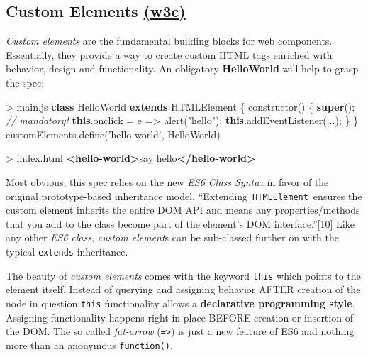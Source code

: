 \documentclass[]{assets/latex/ieee}
\newenvironment{Shaded}{}{}
\newcommand{\KeywordTok}[1]{\textcolor[rgb]{0.00,0.44,0.13}{\textbf{{#1}}}}
\newcommand{\StringTok}[1]{\textcolor[rgb]{0.25,0.44,0.63}{{#1}}}
\newcommand{\CommentTok}[1]{\textcolor[rgb]{0.38,0.63,0.69}{\textit{{#1}}}}
\newcommand{\VariableTok}[1]{\textcolor[rgb]{0.10,0.09,0.49}{{#1}}}
\newcommand{\OperatorTok}[1]{\textcolor[rgb]{0.40,0.40,0.40}{{#1}}}
\newcommand{\AttributeTok}[1]{\textcolor[rgb]{0.49,0.56,0.16}{{#1}}}
\newcommand{\NormalTok}[1]{{#1}}
\begin{document}
\subsection{\texorpdfstring{Custom Elements
\href{http://w3c.github.io/webcomponents/spec/custom/}{(w3c)}}{Custom Elements (w3c)}}\label{custom-elements-w3c}

\emph{Custom elements} are the fundamental building blocks for web
components. Essentially, they provide a way to create custom HTML tags
enriched with behavior, design and functionality. An obligatory
\textbf{HelloWorld} will help to grasp the spec:

\begin{Shaded}
\begin{Highlighting}[]
\OperatorTok{>} \VariableTok{main}\NormalTok{.}\AttributeTok{js}
\KeywordTok{class} \NormalTok{HelloWorld }\KeywordTok{extends} \NormalTok{HTMLElement }\OperatorTok{\{}
  \AttributeTok{constructor}\NormalTok{() }\OperatorTok{\{}
    \KeywordTok{super}\NormalTok{()}\OperatorTok{;} \CommentTok{// mandatory!}
    \KeywordTok{this}\NormalTok{.}\AttributeTok{onclick} \OperatorTok{=} \NormalTok{e }\OperatorTok{=>} \AttributeTok{alert}\NormalTok{(}\StringTok{"hello"}\NormalTok{)}\OperatorTok{;}
    \KeywordTok{this}\NormalTok{.}\AttributeTok{addEventListener}\NormalTok{(...)}\OperatorTok{;}
  \OperatorTok{\}}
\OperatorTok{\}}
\VariableTok{customElements}\NormalTok{.}\AttributeTok{define}\NormalTok{(}\StringTok{'hello-world'}\OperatorTok{,} \NormalTok{HelloWorld)}
\end{Highlighting}
\end{Shaded}

\begin{Shaded}
\begin{Highlighting}[]
\NormalTok{> index.html}
\KeywordTok{<hello-world>}\NormalTok{say hello}\KeywordTok{</hello-world>}
\end{Highlighting}
\end{Shaded}

Most obvious, this spec relies on the new \emph{ES6 Class Syntax} in
favor of the original prototype-based inheritance model.
``Extending~\texttt{HTMLElement}~ensures the custom element inherits the
entire DOM API and means any properties/methods that you add to the
class become part of the element's DOM interface.''{[}10{]} Like any
other \emph{ES6 class}, \emph{custom element}s can be sub-classed
further on with the typical \texttt{extends} inheritance.

The beauty of \emph{custom elements} comes with the keyword
\texttt{this} which points to the element itself. Instead of querying
and assigning behavior AFTER creation of the node in question
\texttt{this} functionality allows a \textbf{declarative programming
style}. Assigning functionality happens right in place BEFORE creation
or insertion of the DOM. The so called \emph{fat-arrow}
(\texttt{=\textgreater{}}) is just a new feature of ES6 and nothing more
than an anonymous \texttt{function()}.
\end{document}
